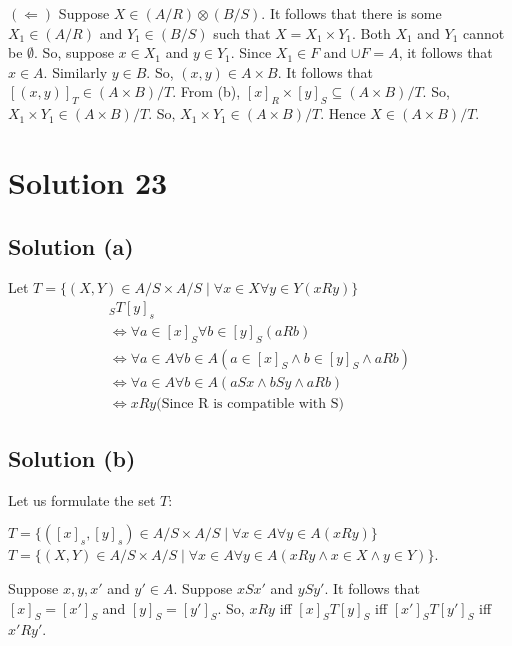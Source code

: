 \documentclass{article}
\begin{document}
$(\Leftarrow)$ Suppose $X \in (A/R) \otimes (B/S)$. It follows that
there is some $X_1 \in (A/R)$ and $Y_1 \in (B/S)$ such that $X=X_1
\times Y_1$. Both $X_1$ and $Y_1$ cannot be $\emptyset$. So, suppose
$x \in X_1$ and $y \in Y_1$. Since $X_1 \in F$ and $\cup F = A$, it
follows that $x \in A$. Similarly $y \in B$. So, $(x,y) \in A \times
B$. It follows that $[(x,y)]_T \in (A \times B)/T$. From (b), $[x]_R
\times [y]_S \subseteq (A \times B)/T$. So, $X_1 \times Y_1 \in (A
\times B)/T$. So, $X_1 \times Y_1 \in (A \times B)/T$. Hence $X \in (A
\times B)/T$.

\section{Solution 23}
\subsection{Solution (a)}
Let $T = \{(X,Y) \in A/S \times A/S \mid \forall x \in X \forall y \in Y(xRy)\}$
\begin{align*}
  [x]_ST[y]_s \\
  \iff \forall a \in [x]_S \forall b \in [y]_S (aRb) \\
  \iff \forall a \in A \forall b \in A (a \in [x]_S \land b \in [y]_S \land aRb) \\
  \iff \forall a \in A \forall b \in A (aSx \land bSy \land aRb) \\
  \iff xRy          \text{(Since R is compatible with S)}
\end{align*}

\subsection{Solution (b)}
Let us formulate the set $T$:

$T = \{([x]_s, [y]_s) \in A/S \times A/S \mid \forall x \in A \forall
y \in A(xRy)\}$ \\
$T = \{(X,Y) \in A/S \times A/S \mid \forall x \in A \forall y \in
A(xRy \land x \in X \land y \in Y)\}$.

Suppose $x,y,x'$ and $y' \in A$. Suppose $xSx'$ and $ySy'$. It follows
that $[x]_S = [x']_S$ and $[y]_S = [y']_S$. So, $xRy$ iff
$[x]_ST[y]_S$ iff $[x']_ST[y']_S$ iff $x'Ry'$.
\end{document}
